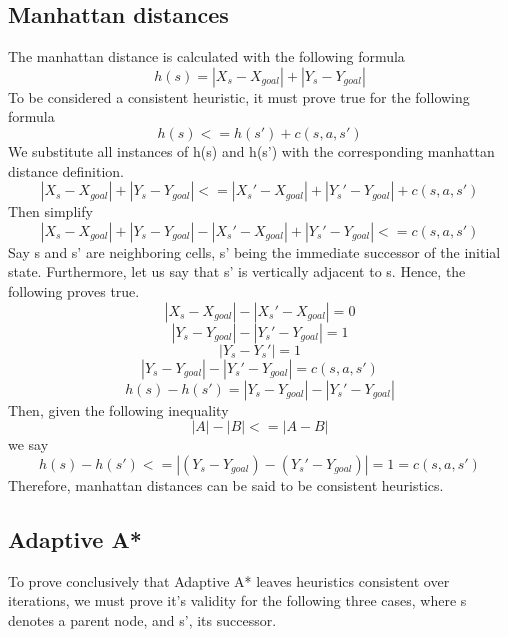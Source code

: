 \documentclass{article}
\begin{document}
\subsection{Manhattan distances}
The manhattan distance is calculated with the following formula
\begin{equation}
	h(s) = |X_s - X_{goal}| + |Y_s - Y_{goal}|
\end{equation}
To be considered a consistent heuristic, it must prove true for the following formula
\begin{equation}
	h(s) <= h(s')+c(s,a,s')
\end{equation}
 We substitute all instances of h(s) and h(s') with the corresponding manhattan distance definition.
\begin{equation}
	|X_s - X_{goal}| + |Y_s - Y_{goal}| <= |X_s' - X_{goal}| + |Y_s' - Y_{goal}| + c(s,a,s')
\end{equation}
Then simplify
\begin{equation}
	|X_s - X_{goal}| + |Y_s - Y_{goal}| - |X_s' - X_{goal}| + |Y_s' - Y_{goal}| <= c(s,a,s')
\end{equation}
Say s and s' are neighboring cells, s' being the immediate successor of the initial state. Furthermore, let us say that s' is vertically adjacent to s. Hence, the following proves true.
\begin{equation}
	|X_s - X_{goal}| - |X_s' - X_{goal}| = 0	
\end{equation}
\begin{equation} 
	|Y_s - Y_{goal}| - |Y_s' - Y_{goal}| = 1
\end{equation}
\begin{equation} 
	|Y_s - Y_s'| = 1
\end{equation}
\begin{equation} 
	|Y_s - Y_{goal}| - |Y_s' - Y_{goal}| = c(s,a,s')
\end{equation}
\begin{equation} 
	h(s) - h(s') = |Y_s - Y_{goal}| - |Y_s' - Y_{goal}|
\end{equation}
Then, given the following inequality
\begin{equation}
	|A| - |B| <= |A-B|
\end{equation}
we say
\begin{equation}
	h(s) - h(s') <= |(Y_s - Y_{goal}) - (Y_s' - Y_{goal})|
		= 1
		= c(s,a,s')
\end{equation}
Therefore, manhattan distances can be said to be consistent heuristics.
\subsection{Adaptive A*}
To prove conclusively that Adaptive A* leaves heuristics consistent over iterations, we must prove it's validity for the following three cases, where s denotes a parent node, and s', its successor.
\end{document}
